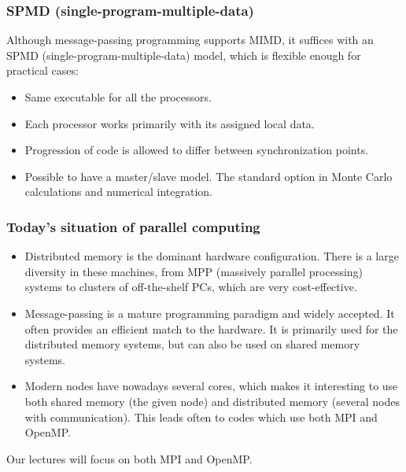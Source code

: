 \documentclass{beamer}
\begin{document}
\begin{frame}
\frametitle{SPMD (single-program-multiple-data)}

\begin{block}{}

Although message-passing programming supports MIMD, it 
suffices with an SPMD (single-program-multiple-data) model, which
is flexible enough for practical cases:

\begin{itemize}
\item Same executable for all the processors.

\item Each processor works primarily with its assigned local data.

\item Progression of code is allowed to differ between synchronization points.

\item Possible to have a master/slave model. The standard option in Monte Carlo calculations and numerical integration.
\end{itemize}

\noindent
\end{block}
\end{frame}

\begin{frame}
\frametitle{Today's situation of parallel computing}

\begin{block}{}

\begin{itemize}
\item Distributed memory is the dominant hardware configuration. There is a large diversity in these machines, from  MPP (massively parallel processing) systems to clusters of off-the-shelf PCs, which are very cost-effective.

\item Message-passing is a mature programming paradigm and widely accepted. It often provides an efficient match to the hardware. It is primarily used for the distributed memory systems, but can also be used on shared memory systems.

\item Modern nodes have nowadays several cores, which makes it interesting to use both shared memory (the given node) and distributed memory (several nodes with communication). This leads often to codes which use both MPI and OpenMP.
\end{itemize}

\noindent
Our lectures will focus on both MPI and OpenMP.

\end{block}
\end{frame}
\end{document}
